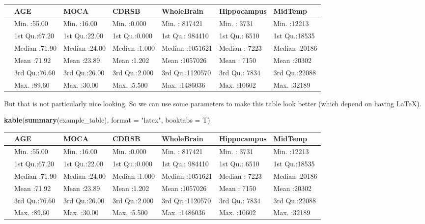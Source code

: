 \documentclass[]{article}
\newenvironment{Shaded}{\begin{snugshade}}{\end{snugshade}}
\newcommand{\DataTypeTok}[1]{\textcolor[rgb]{0.13,0.29,0.53}{#1}}
\newcommand{\KeywordTok}[1]{\textcolor[rgb]{0.13,0.29,0.53}{\textbf{#1}}}
\newcommand{\NormalTok}[1]{#1}
\newcommand{\StringTok}[1]{\textcolor[rgb]{0.31,0.60,0.02}{#1}}
\begin{document}
\begin{tabular}{l|l|l|l|l|l|l}
\hline
  &      AGE &      MOCA &     CDRSB &   WholeBrain &  Hippocampus &    MidTemp\\
\hline
 & Min.   :55.00 & Min.   :16.00 & Min.   :0.000 & Min.   : 817421 & Min.   : 3731 & Min.   :12213\\
\hline
 & 1st Qu.:67.20 & 1st Qu.:22.00 & 1st Qu.:0.000 & 1st Qu.: 984410 & 1st Qu.: 6510 & 1st Qu.:18535\\
\hline
 & Median :71.90 & Median :24.00 & Median :1.000 & Median :1051621 & Median : 7223 & Median :20186\\
\hline
 & Mean   :71.92 & Mean   :23.89 & Mean   :1.202 & Mean   :1057026 & Mean   : 7150 & Mean   :20302\\
\hline
 & 3rd Qu.:76.60 & 3rd Qu.:26.00 & 3rd Qu.:2.000 & 3rd Qu.:1120570 & 3rd Qu.: 7834 & 3rd Qu.:22088\\
\hline
 & Max.   :89.60 & Max.   :30.00 & Max.   :5.500 & Max.   :1486036 & Max.   :10602 & Max.   :32189\\
\hline
\end{tabular}

But that is not particularly nice looking. So we can use some parameters
to make this table look better (which depend on having LaTeX).

\begin{Shaded}
\begin{Highlighting}[]
\KeywordTok{kable}\NormalTok{(}\KeywordTok{summary}\NormalTok{(example_table), }\DataTypeTok{format =} \StringTok{"latex"}\NormalTok{, }\DataTypeTok{booktabs =}\NormalTok{ T)}
\end{Highlighting}
\end{Shaded}

\begin{tabular}{lllllll}
\toprule
  &      AGE &      MOCA &     CDRSB &   WholeBrain &  Hippocampus &    MidTemp\\
\midrule
 & Min.   :55.00 & Min.   :16.00 & Min.   :0.000 & Min.   : 817421 & Min.   : 3731 & Min.   :12213\\
 & 1st Qu.:67.20 & 1st Qu.:22.00 & 1st Qu.:0.000 & 1st Qu.: 984410 & 1st Qu.: 6510 & 1st Qu.:18535\\
 & Median :71.90 & Median :24.00 & Median :1.000 & Median :1051621 & Median : 7223 & Median :20186\\
 & Mean   :71.92 & Mean   :23.89 & Mean   :1.202 & Mean   :1057026 & Mean   : 7150 & Mean   :20302\\
 & 3rd Qu.:76.60 & 3rd Qu.:26.00 & 3rd Qu.:2.000 & 3rd Qu.:1120570 & 3rd Qu.: 7834 & 3rd Qu.:22088\\
 & Max.   :89.60 & Max.   :30.00 & Max.   :5.500 & Max.   :1486036 & Max.   :10602 & Max.   :32189\\
\bottomrule
\end{tabular}
\end{document}
